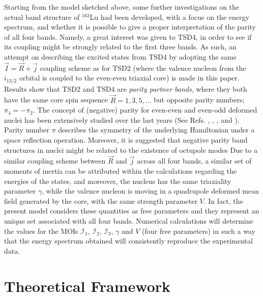 \documentclass[%
 reprint,
 amsmath,
 amssymb,
 aps,
]{revtex4-2}
\begin{document}
Starting from the model sketched above, some further investigations on the actual band structure of $^{163}$Lu had been developed, with a focus on the energy spectrum, and whether it is possible to give a proper interpretation of the parity of all four bands. Namely, a great interest was given to TSD4, in order to see if its coupling might be strongly related to the first three bands. As such, an attempt on describing the excited states from TSD4 by adopting the same $\vec{I}=\vec{R}+\vec{j}$ coupling scheme as for TSD2 (where the valence nucleon from the $i_{13/2}$ orbital is coupled to the even-even triaxial core) is made in this paper. Results show that TSD2 and TSD4 are \emph{parity partner bands}, where they both have the same core spin sequence $\vec{R}=1,3,5,\dots$ but opposite parity numbers; $\pi_4=-\pi_2$. The concept of (negative) parity for even-even and even-odd deformed nuclei has been extensively studied over the last years (See Refs. \cite{raduta2006description}, \cite{raduta2006positive}, \cite{raduta2006simultaneous}, and \cite{bizzeti2008description}). 
Parity number $\pi$ describes the symmetry of the underlying Hamiltonian under a space reflection operation. Moreover, it is suggested that negative parity band structures in nuclei might be related to the existence of octupole modes Due to a similar coupling scheme between $\vec{R}$ and $\vec{j}$ across all four bands, a similar set of moments of inertia can be attributed within the calculations regarding the energies of the states, and moreover, the nucleus has the same triaxiality parameter $\gamma$, while the valence nucleon is moving in a quadrupole deformed mean field generated by the core, with the same strength parameter $V$. In fact, the present model considers these quantities as free parameters and they represent an unique set associated with all four bands. Numerical calculations will determine the values for the MOIs $\mathcal{I}_1$, $\mathcal{I}_2$, $\mathcal{I}_3$, $\gamma$ and $V$ (four free parameters) in such a way that the energy spectrum obtained will consistently reproduce the experimental data.


\section{Theoretical Framework}

\end{document}
